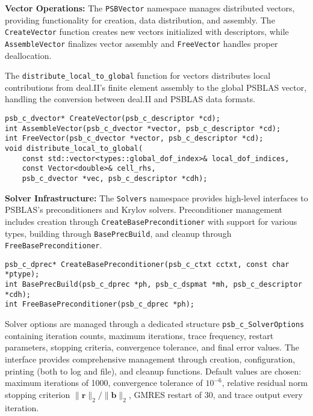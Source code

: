 \documentclass[a4paper,12pt]{article}
\begin{document}
\textbf{Vector Operations:} The \texttt{PSBVector} namespace manages distributed vectors, 
providing functionality for creation, data distribution, and assembly. 
The \texttt{CreateVector} function creates new vectors initialized with descriptors, 
while \texttt{AssembleVector} finalizes vector assembly and \texttt{FreeVector} handles proper 
deallocation. 

The \texttt{distribute\_local\_to\_global} function for vectors distributes local 
contributions from deal.II's finite element assembly to the global PSBLAS vector, 
handling the conversion between deal.II and PSBLAS data formats.

\begin{lstlisting}[caption=Vector operations]
psb_c_dvector* CreateVector(psb_c_descriptor *cd);
int AssembleVector(psb_c_dvector *vector, psb_c_descriptor *cd);
int FreeVector(psb_c_dvector *vector, psb_c_descriptor *cd);
void distribute_local_to_global(
    const std::vector<types::global_dof_index>& local_dof_indices,
    const Vector<double>& cell_rhs,
    psb_c_dvector *vec, psb_c_descriptor *cdh);
\end{lstlisting}

\textbf{Solver Infrastructure:} The \texttt{Solvers} namespace provides high-level 
interfaces to PSBLAS's preconditioners and Krylov solvers. Preconditioner management 
includes creation through \texttt{CreateBasePreconditioner} with support for various 
types, building through \texttt{BasePrecBuild}, and cleanup through 
\texttt{FreeBasePreconditioner}.

\begin{lstlisting}[caption=Preconditioner and solver management]
psb_c_dprec* CreateBasePreconditioner(psb_c_ctxt cctxt, const char *ptype);
int BasePrecBuild(psb_c_dprec *ph, psb_c_dspmat *mh, psb_c_descriptor *cdh);
int FreeBasePreconditioner(psb_c_dprec *ph);
\end{lstlisting}

Solver options are managed through a dedicated structure \texttt{psb\_c\_SolverOptions} 
containing iteration counts, maximum iterations, trace frequency, restart parameters, 
stopping criteria, convergence tolerance, and final error values. The interface provides 
comprehensive management through creation, configuration, printing (both to log and file), 
and cleanup functions. Default values are chosen: maximum iterations of 1000, 
convergence tolerance of $10^{-6}$, relative residual norm stopping criterion 
$\|\mathbf{r}\|_2/\|\mathbf{b}\|_2$, GMRES restart of 30, and trace output every iteration.
\end{document}
